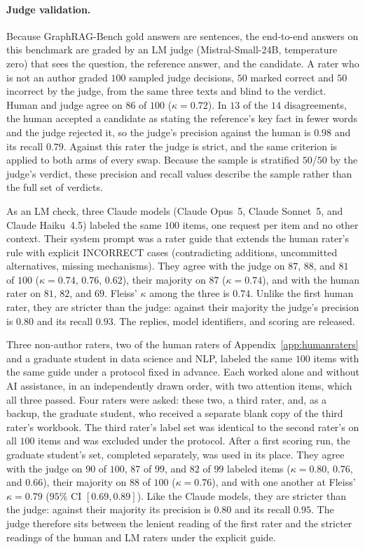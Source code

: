\documentclass[11pt]{article}
\begin{document}
\paragraph{Judge validation.} Because GraphRAG-Bench gold answers are sentences, the end-to-end answers on this benchmark are graded by an LM judge (Mistral-Small-24B, temperature zero) that sees the question, the reference answer, and the candidate. A rater who is not an author graded $100$ sampled judge decisions, $50$ marked correct and $50$ incorrect by the judge, from the same three texts and blind to the verdict. Human and judge agree on $86$ of $100$ ($\kappa=0.72$). In $13$ of the $14$ disagreements, the human accepted a candidate as stating the reference's key fact in fewer words and the judge rejected it, so the judge's precision against the human is $0.98$ and its recall $0.79$. Against this rater the judge is strict, and the same criterion is applied to both arms of every swap. Because the sample is stratified $50$/$50$ by the judge's verdict, these precision and recall values describe the sample rather than the full set of verdicts.

As an LM check, three Claude models (Claude Opus~5, Claude Sonnet~5, and Claude Haiku~4.5) labeled the same $100$ items, one request per item and no other context. Their system prompt was a rater guide that extends the human rater's rule with explicit INCORRECT cases (contradicting additions, uncommitted alternatives, missing mechanisms). They agree with the judge on $87$, $88$, and $81$ of $100$ ($\kappa=0.74$, $0.76$, $0.62$), their majority on $87$ ($\kappa=0.74$), and with the human rater on $81$, $82$, and $69$. Fleiss' $\kappa$ among the three is $0.74$. Unlike the first human rater, they are stricter than the judge: against their majority the judge's precision is $0.80$ and its recall $0.93$. The replies, model identifiers, and scoring are released.

Three non-author raters, two of the human raters of Appendix~\ref{app:humanraters} and a graduate student in data science and NLP, labeled the same $100$ items with the same guide under a protocol fixed in advance. Each worked alone and without AI assistance, in an independently drawn order, with two attention items, which all three passed. Four raters were asked: these two, a third rater, and, as a backup, the graduate student, who received a separate blank copy of the third rater's workbook. The third rater's label set was identical to the second rater's on all $100$ items and was excluded under the protocol. After a first scoring run, the graduate student's set, completed separately, was used in its place. They agree with the judge on $90$ of $100$, $87$ of $99$, and $82$ of $99$ labeled items ($\kappa=0.80$, $0.76$, and $0.66$), their majority on $88$ of $100$ ($\kappa=0.76$), and with one another at Fleiss' $\kappa=0.79$ ($95\%$ CI $[0.69,0.89]$). Like the Claude models, they are stricter than the judge: against their majority its precision is $0.80$ and its recall $0.95$. The judge therefore sits between the lenient reading of the first rater and the stricter readings of the human and LM raters under the explicit guide.
\end{document}
